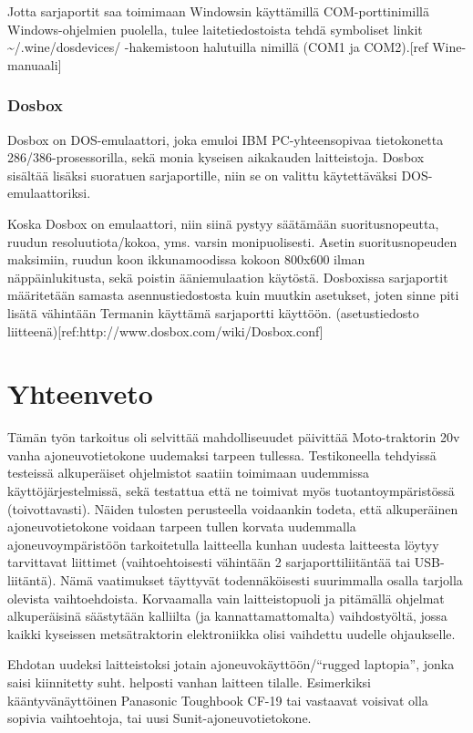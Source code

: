 \documentclass[]{article}
\begin{document}
Jotta sarjaportit saa toimimaan Windowsin käyttämillä COM-porttinimillä
Windows-ohjelmien puolella, tulee laitetiedostoista tehdä symboliset
linkit \textasciitilde{}/.wine/dosdevices/ -hakemistoon halutuilla
nimillä (COM1 ja COM2).{[}ref Wine-manuaali{]}

\subsection{Dosbox}\label{dosbox}

Dosbox on DOS-emulaattori, joka emuloi IBM PC-yhteensopivaa tietokonetta
286/386-prosessorilla, sekä monia kyseisen aikakauden laitteistoja.
Dosbox sisältää lisäksi suoratuen sarjaportille, niin se on valittu
käytettäväksi DOS-emulaattoriksi.

Koska Dosbox on emulaattori, niin siinä pystyy säätämään
suoritusnopeutta, ruudun resoluutiota/kokoa, yms. varsin monipuolisesti.
Asetin suoritusnopeuden maksimiin, ruudun koon ikkunamoodissa kokoon
800x600 ilman näppäinlukitusta, sekä poistin ääniemulaation käytöstä.
Dosboxissa sarjaportit määritetään samasta asennustiedostosta kuin
muutkin asetukset, joten sinne piti lisätä vähintään Termanin käyttämä
sarjaportti käyttöön. (asetustiedosto
liitteenä){[}ref:http://www.dosbox.com/wiki/Dosbox.conf{]}

\chapter{Yhteenveto}\label{yhteenveto}

Tämän työn tarkoitus oli selvittää mahdolliseuudet päivittää
Moto-traktorin 20v vanha ajoneuvotietokone uudemaksi tarpeen tullessa.
Testikoneella tehdyissä testeissä alkuperäiset ohjelmistot saatiin
toimimaan uudemmissa käyttöjärjestelmissä, sekä testattua että ne
toimivat myös tuotantoympäristössä (toivottavasti). Näiden tulosten
perusteella voidaankin todeta, että alkuperäinen ajoneuvotietokone
voidaan tarpeen tullen korvata uudemmalla ajoneuvoympäristöön
tarkoitetulla laitteella kunhan uudesta laitteesta löytyy tarvittavat
liittimet (vaihtoehtoisesti vähintään 2 sarjaporttiliitäntää tai
USB-liitäntä). Nämä vaatimukset täyttyvät todennäköisesti suurimmalla
osalla tarjolla olevista vaihtoehdoista. Korvaamalla vain
laitteistopuoli ja pitämällä ohjelmat alkuperäisinä säästytään kalliilta
(ja kannattamattomalta) vaihdostyöltä, jossa kaikki kyseissen
metsätraktorin elektroniikka olisi vaihdettu uudelle ohjaukselle.

Ehdotan uudeksi laitteistoksi jotain ajoneuvokäyttöön/``rugged
laptopia'', jonka saisi kiinnitetty suht. helposti vanhan laitteen
tilalle. Esimerkiksi kääntyvänäyttöinen Panasonic Toughbook CF-19 tai
vastaavat voisivat olla sopivia vaihtoehtoja, tai uusi
Sunit-ajoneuvotietokone.
\end{document}
